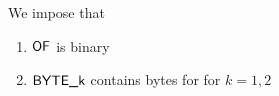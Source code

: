 We impose that
\begin{enumerate}
	\item $\textsf{OF}$ is binary
	\item $\textsf{BYTE}\textsf{\_k}$ contains bytes for for $k = 1, 2$
\end{enumerate}
